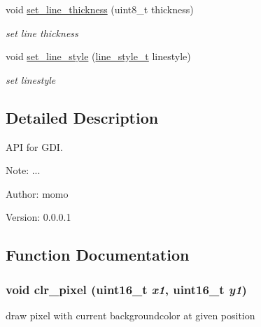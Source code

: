 \begin{CompactItemize}
void \hyperlink{group__hgdi__api_g4e1ad4c71558a1855664187428409bba}{set\_\-line\_\-thickness} (uint8\_\-t thickness)
\begin{CompactList}\small\item\em set line thickness \item\end{CompactList}\item 
void \hyperlink{group__hgdi__api_gb9b7e1a4efa87c1d2a8e6b34d49a3aeb}{set\_\-line\_\-style} (\hyperlink{group__hgdi__types_gdfccdb9380d340f00e646a1fd04b79d9}{line\_\-style\_\-t} linestyle)
\begin{CompactList}\small\item\em set linestyle \item\end{CompactList}\end{CompactItemize}


\subsection{Detailed Description}
API for GDI. 

\begin{Desc}
\item[Note:]... \end{Desc}
\begin{Desc}
\item[Author:]momo \end{Desc}
\begin{Desc}
\item[Version:]0.0.0.1 \end{Desc}


\subsection{Function Documentation}
\hypertarget{group__hgdi__api_g7f1f418ba1d392e2f8f2ea2bf346c2c0}{
\subsubsection[{clr\_\-pixel}]{\setlength{\rightskip}{0pt plus 5cm}void clr\_\-pixel (uint16\_\-t {\em x1}, \/  uint16\_\-t {\em y1})}}
\label{group__hgdi__api_g7f1f418ba1d392e2f8f2ea2bf346c2c0}


draw pixel with current backgroundcolor at given position 

